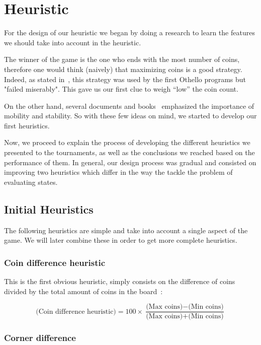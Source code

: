 \documentclass{article}
\begin{document}
\section{Heuristic}

For the design of our heuristic we began by doing a research to learn the features we should take into account in the heuristic.  

The winner of the game is the one who ends with the most number of coins, therefore one would think (naively) that maximizing coins is a good strategy. Indeed, as stated in~\textcite{washington1}, this strategy was used by the first Othello programs but "failed miserably". This gave us our first clue to weigh ``low'' the coin count. 

On the other hand, several documents and books~\autocite{paradigms} emphasized the importance of mobility and stability. So with these few ideas on mind, we started to develop our first heuristics.

Now, we proceed to explain the process of developing the different heuristics we presented to the tournaments, as well as the conclusions we reached based on the performance of them. In general, our design process was gradual and consisted on improving two heuristics which differ in the way the tackle the problem of evaluating states.

\subsection{Initial Heuristics}

The following heuristics are simple and take into account a single aspect of the game. We will later combine these in order to get more complete heuristics.

\subsubsection{Coin difference heuristic }

This is the first obvious heuristic, simply consists on the difference of coins divided by the total amount of coins in the board~\autocite{washington1}:

$$\text{(Coin difference heuristic)} = 100 \times\frac{\text{(Max coins)}-\text{(Min coins)}}{\text{(Max coins)}+\text{(Min coins)}}$$

\subsubsection{Corner difference }
\end{document}
